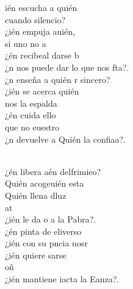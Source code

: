 \documentclass[12pt]{article}
\begin{document}
\begin{multicols*}{2}
\begin{cancion}%
	ién escucha a quién \\
	cuando silencio?\\
	¿ién empuja auién, \\
	si uno no a\\
	¿én recibeal darse b\\
	¿n nos puede dar lo que nos fta?.  \\
	¿n enseña a quién r sincero?  \\
	¿ién se acerca quién  \\
	nos la espalda\\
	¿én cuida ello  \\
	que no euestro\\
	¿n devuelve a Quién la confiaa?.  \\\jump\\
	\begin{chorus}%
	¿én libera aén delfrimieo? \\
	Quién acogeuién esta\\
	Quién llena dluz \\
	at \\
	¿ién le da o a la Pabra?. \\
	¿én pinta de  eliverso\\
	¿ién con su pncia nosr\\
	¿ién quiere sarse  \\
	oñ \\
	¿ién mantiene iacta la Eanza?. \\

\end{chorus}
\end{cancion}
\end{multicols*}
\end{document}
